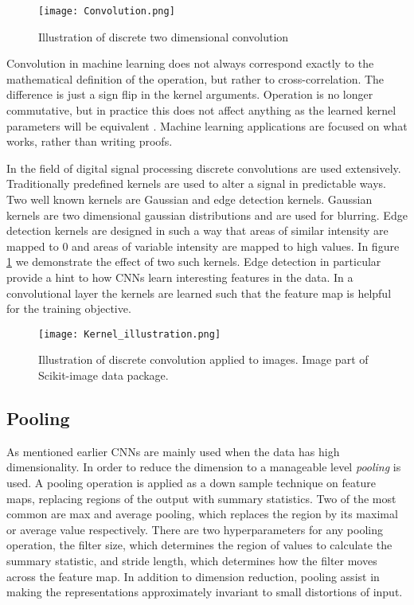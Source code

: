 \documentclass[../../thesis.tex]{subfiles}
\begin{document}
\begin{figure}[h]
    \texttt{[image: Convolution.png]}
    \centering    
    \caption{Illustration of discrete two dimensional convolution}
\end{figure}

Convolution in machine learning does not always correspond exactly to the mathematical definition of the operation, but rather to cross-correlation. The difference is just a sign flip in the kernel arguments. Operation is no longer commutative, but in practice this does not affect anything as the learned kernel parameters will be equivalent \cite{deeplearningbook}. Machine learning applications are focused on what works, rather than writing proofs. \newline

In the field of digital signal processing discrete convolutions are used extensively. Traditionally predefined kernels are used to alter a signal in predictable ways. Two well known kernels are Gaussian and edge detection kernels. Gaussian kernels are two dimensional gaussian distributions and are used for blurring. Edge detection kernels are designed in such a way that areas of similar intensity are mapped to $0$ and areas of variable intensity are mapped to high values. In figure \ref{fig:kernelIllustration} we demonstrate the effect of two such kernels. Edge detection in particular provide a hint to how CNNs learn interesting features in the data. In a convolutional layer the kernels are learned such that the feature map is helpful for the training objective. 
\begin{figure}[h]
    \centering
    \texttt{[image: Kernel\_illustration.png]}
    \caption{Illustration of discrete convolution applied to images. Image part of Scikit-image data package.}
    \label{fig:kernelIllustration}
\end{figure}

\subsection{Pooling}
As mentioned earlier CNNs are mainly used when the data has high dimensionality. In order to reduce the dimension to a manageable level \textit{pooling} is used. A pooling operation is applied as a down sample technique on feature maps, replacing regions of the output with summary statistics. Two of the most common are max and average pooling, which replaces the region by its maximal or average value respectively. There are two hyperparameters for any pooling operation, the filter size, which determines the region of values to calculate the summary statistic, and stride length, which determines how the filter moves across the feature map. In addition to dimension reduction, pooling assist in making the representations approximately invariant to small distortions of input. 
\end{document}
